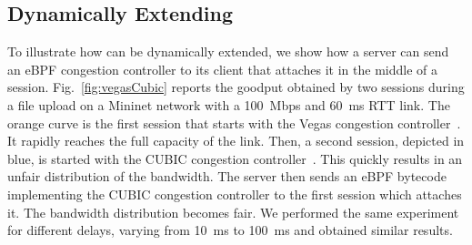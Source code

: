 \subsection{Dynamically Extending \tcpls}
%

To illustrate how \tcpls can be dynamically extended, we show how a server can
send an eBPF congestion controller to its client that attaches it in the middle
of a \tcpls session. Fig.~\ref{fig:vegasCubic} reports the goodput obtained
by two \tcpls sessions during a file upload on a Mininet network with a
100~Mbps and 60~ms RTT link.
The orange curve is the first \tcpls session that starts with the Vegas
congestion controller~\cite{brakmo1994tcp}. It rapidly reaches the full capacity of the link. Then, a second \tcpls session, depicted in blue, is
started with the CUBIC congestion controller~\cite{rfc8312}. This quickly
results in an unfair distribution of the bandwidth. The server then sends an
eBPF bytecode implementing the CUBIC congestion controller to the first \tcpls
session which attaches it. The bandwidth distribution becomes fair. We
performed the same experiment for different delays, varying from 10~ms to 100~ms
and obtained similar results.

